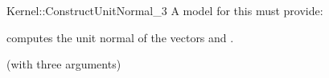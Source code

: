 \begin{ccRefFunctionObjectConcept}{Kernel::ConstructUnitNormal_3}
A model for this must provide:


 {computes the unit normal of the vectors and .}

\ccRefines
{} (with three arguments)

\ccSeeAlso
{} \\
 \\
\end{ccRefFunctionObjectConcept}
